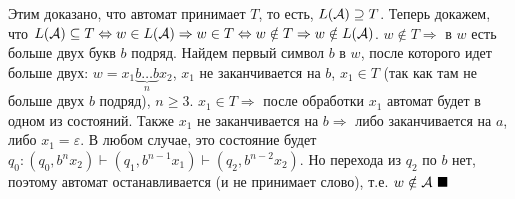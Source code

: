 \documentclass[a4paper]{article}
\begin{document}
\begin{enumerate}[1.]
\begin{enumerate}[a.]
\end{enumerate}
Этим доказано, что автомат принимает $T$, то есть, $L({\cal A})\supseteq T$.\newline
Теперь докажем, что $L({\cal A})\subseteq T\Leftrightarrow w\in L({\cal A})\Rightarrow w\in T\Leftrightarrow w\notin T\Rightarrow w\notin L({\cal A})$.\newline
$w\notin T\Rightarrow$ в $w$ есть больше двух букв $b$ подряд. Найдем первый символ $b$ в $w$, после которого идет больше двух: $w=x_1\underbrace{b\dots b}_{n}x_2$, $x_1$ не заканчивается на $b$, $x_1\in T$ (так как там не больше двух $b$ подряд), $n\geqslant 3$.\newline
$x_1\in T\Rightarrow$ после обработки $x_1$ автомат будет в одном из состояний. Также $x_1$ не заканчивается на $b\Rightarrow$ либо заканчивается на $a$, либо $x_1=\varepsilon$. В любом случае, это состояние будет $q_0:(q_0,b^nx_2)\vdash(q_1,b^{n-1}x_1)\vdash(q_2,b^{n-2}x_2)$. Но перехода из $q_2$ по $b$ нет, поэтому автомат останавливается (и не принимает слово), т.е. $w\notin {\cal A}~\blacksquare$
\end{enumerate}
\end{document}

